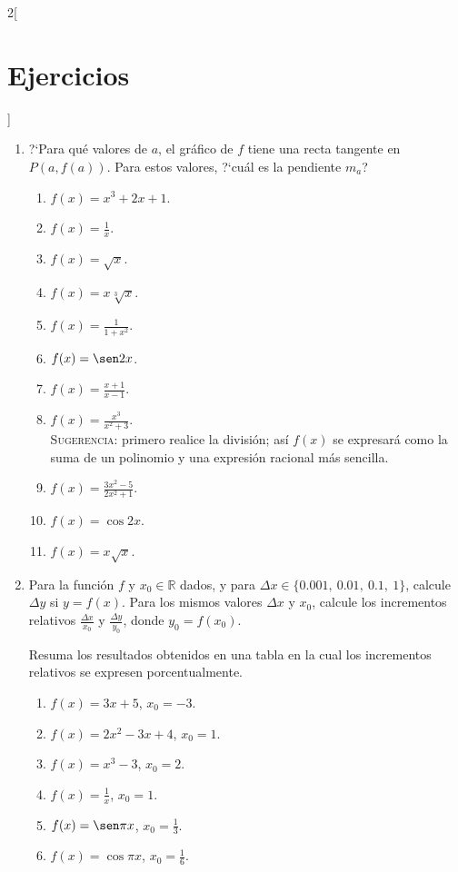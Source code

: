 \begin{multicols}{2}[\section{Ejercicios}]
\begin{enumerate}[leftmargin=*]
\item ?`Para qué valores de $a$, el gráfico de $f$ tiene una recta tangente en $P(a,f(a))$. Para
    estos valores, ?`cuál es la pendiente $m_a$?
    \begin{enumerate}[leftmargin=*]
    \item $\displaystyle f(x) = x^3 + 2x + 1$.
    \item $\displaystyle f(x) = \frac{1}{x}$.
    \item $\displaystyle f(x) = \sqrt{x}$.
    \item $\displaystyle f(x) = x\sqrt[3]{x}$.
    \item $\displaystyle f(x) = \frac{1}{1 + x^2}$.
    \item $\displaystyle f(x) = \sen 2x$.
    \item $\displaystyle f(x) = \frac{x + 1}{x - 1}$.
    \item $\displaystyle f(x) = \frac{x^3}{x^2 + 3}$.\\
          \textsc{Sugerencia}: primero realice la división; así $f(x)$ se expresará como la
          suma de un polinomio y una expresión racional más sencilla.
    \item $\displaystyle f(x) = \frac{3x^2 - 5}{2x^2 + 1}$.
    \item $\displaystyle f(x) = \cos 2x$.
    \item $\displaystyle f(x) = x\sqrt{x}$.
    \end{enumerate}

\item Para la función $f$ y $x_0\in\mathbb{R}$ dados, y para $\Delta x \in \{0.001,\ 0.01,\
    0.1,\ 1\}$, calcule $\Delta y$ si $y = f(x)$. Para los mismos valores $\Delta x$ y $x_0$,
    calcule los incrementos relativos $\displaystyle \frac{\Delta x}{x_0}$ y
    $\displaystyle\frac{\Delta y}{y_0}$, donde $y_0 = f(x_0)$.

    Resuma los resultados obtenidos en una tabla en la cual los incrementos relativos se
    expresen porcentualmente.
    \begin{enumerate}[leftmargin=*]
    \item $\displaystyle f(x) = 3x + 5$, $x_0 = -3$.
    \item $\displaystyle f(x) = 2x^2 - 3x + 4$, $x_0 = 1$.
    \item $\displaystyle f(x) = x^3 - 3$, $x_0 = 2$.
    \item $\displaystyle f(x) = \frac{1}{x}$, $x_0 = 1$.
    \item $\displaystyle f(x) = \sen \pi x$, $\displaystyle x_0 = \frac{1}{3}$.
    \item $\displaystyle f(x) = \cos \pi x$, $\displaystyle x_0 = \frac{1}{6}$.
    \end{enumerate}


\end{enumerate}
\end{multicols}
